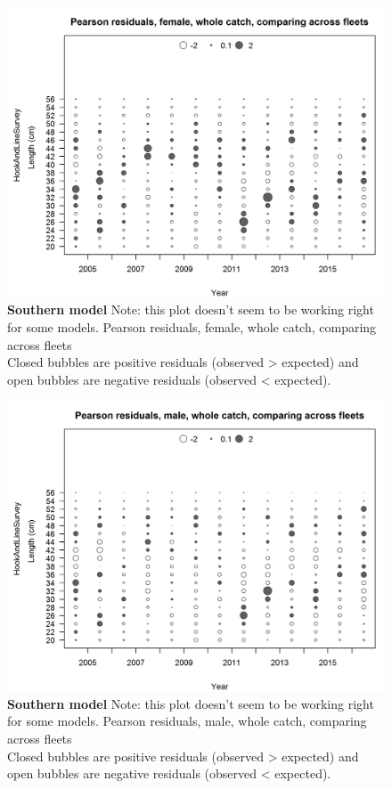 \documentclass[12pt,]{article}
\begin{document}
\begin{figure}[htbp]
\centering
\includegraphics{./r4ss/plots_mod2/comp_lenfit_sex2mkt0_multi-fleet_comparison.png}
\caption{\textbf{Southern model} Note: this plot doesn't seem to be
working right for some models. Pearson residuals, female, whole catch,
comparing across fleets\\
Closed bubbles are positive residuals (observed \textgreater{} expected)
and open bubbles are negative residuals (observed \textless{} expected).
\label{fig:mod2_23_comp_lenfit_sex2mkt0_multi-fleet_comparison}}
\end{figure}

\begin{figure}[htbp]
\centering
\includegraphics{./r4ss/plots_mod2/comp_lenfit_sex3mkt0_multi-fleet_comparison.png}
\caption{\textbf{Southern model} Note: this plot doesn't seem to be
working right for some models. Pearson residuals, male, whole catch,
comparing across fleets\\
Closed bubbles are positive residuals (observed \textgreater{} expected)
and open bubbles are negative residuals (observed \textless{} expected).
\label{fig:mod2_24_comp_lenfit_sex3mkt0_multi-fleet_comparison}}
\end{figure}
\end{document}
